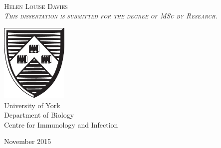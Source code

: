 
{
\pagestyle{empty}

\centering
\null\vfill


\fontsize{36.5}{34}\scshape{}
\\[2cm]%

\fontsize{24}{30}\normalfont
Helen Louise Davies\\[0.5cm]%

\fontsize{13}{16}\itshape
This dissertation is submitted for the degree of MSc by Research.

\vfill

\includegraphics[width=3.2cm]{Figures/Shield.eps}\\[0.6cm]

\fontsize{16}{20}\normalfont
University of York\\
Department of Biology\\
Centre for Immunology and Infection\\[10pt]


\vfill

\fontsize{20}{30}\normalfont
November 2015

\vfill\null

\restoregeometry
}